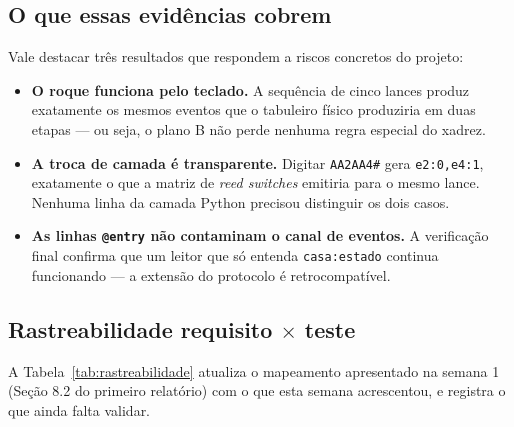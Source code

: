 \documentclass[12pt,a4paper]{article}
\begin{document}
\subsection{O que essas evidências cobrem}

Vale destacar três resultados que respondem a riscos concretos do projeto:

\begin{itemize}
  \item \textbf{O roque funciona pelo teclado.} A sequência de cinco lances
        produz exatamente os mesmos eventos que o tabuleiro físico produziria
        em duas etapas --- ou seja, o plano B não perde nenhuma regra especial
        do xadrez.
  \item \textbf{A troca de camada é transparente.} Digitar \texttt{AA2AA4\#}
        gera \texttt{e2:0,e4:1}, exatamente o que a matriz de \emph{reed
        switches} emitiria para o mesmo lance. Nenhuma linha da camada Python
        precisou distinguir os dois casos.
  \item \textbf{As linhas \texttt{@entry} não contaminam o canal de eventos.}
        A verificação final confirma que um leitor que só entenda
        \texttt{casa:estado} continua funcionando --- a extensão do protocolo é
        retrocompatível.
\end{itemize}

\subsection{Rastreabilidade requisito \texorpdfstring{$\times$}{x} teste}
\label{sec:rastreabilidade}

A Tabela~\ref{tab:rastreabilidade} atualiza o mapeamento apresentado na semana
1 (Seção 8.2 do primeiro relatório) com o que esta semana acrescentou, e
registra o que ainda falta validar.
\end{document}
